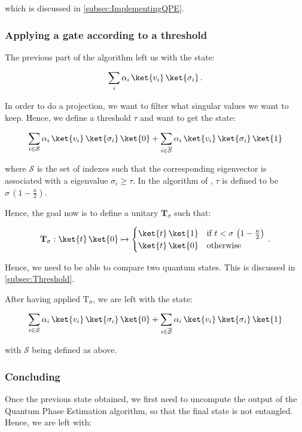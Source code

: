 \documentclass[11pt, a4paper]{article}
\begin{document}
                which is discussed in \autoref{subsec:ImplementingQPE}.
            \subsubsection{Applying a gate according to a threshold}
                The previous part of the algorithm left us with the state:
                
                \[\sum_{i}\alpha_i\,\ket{v_i}\,\ket{\sigma_i}\,.\]
                
                In order to do a projection, we want to filter what singular values we want to keep. Hence, we define a threshold \(\tau\) and want to get the state:
                
                \[\sum_{i\in\mathcal{S}}\alpha_i\,\ket{v_i}\,\ket{\sigma_i}\,\ket{0} + \sum_{i\in\overline{\mathcal{S}}}\alpha_i\,\ket{v_i}\,\ket{\sigma_i}\,\ket{1}\]
                
                where \(\mathcal{S}\) is the set of indexes such that the corresponding eigenvector is associated with a eigenvalue \(\sigma_i\geqslant\tau\). In the algorithm of \citeauthor{QRS}, \(\tau\) is defined to be \(\sigma\,\left(1-\frac\kappa2\right)\).
                
                Hence, the goal now is to define a unitary \(\mathbf{T}_\sigma\) such that:
                
                \[\mathbf{T}_\sigma:\ket{t}\,\ket{0}\mapsto\begin{cases}\ket{t}\,\ket{1} &\text{if } t < \sigma\,\left(1-\frac\kappa2\right)\\\ket{t}\,\ket{0}&\text{otherwise}\end{cases}\,.\]
                
                Hence, we need to be able to compare two quantum states. This is discussed in \autoref{subsec:Threshold}.
                
                After having applied \(\mathrm{T}_\sigma\), we are left with the state:
                
                \[\sum_{i\in\mathcal{S}}\alpha_i\,\ket{v_i}\,\ket{\sigma_i}\,\ket{0} + \sum_{i\in\overline{\mathcal{S}}}\alpha_i\,\ket{v_i}\,\ket{\sigma_i}\,\ket{1}\]
                
                with \(\mathcal{S}\) being defined as above.
            \subsubsection{Concluding}
                Once the previous state obtained, we first need to uncompute the output of the Quantum Phase Estimation algorithm, so that the final state is not entangled. Hence, we are left with:
                
\end{document}
